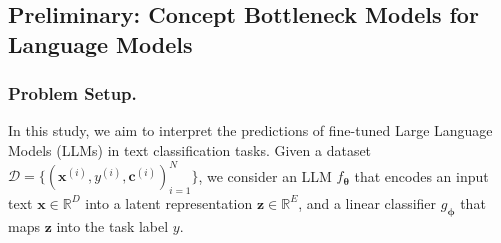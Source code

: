 \documentclass[letterpaper]{article} %
\begin{document}
\subsection{Preliminary: Concept Bottleneck Models for Language Models
}
\subsubsection{Problem Setup.}\label{sec:setup}
In this study, we aim to interpret the predictions of fine-tuned Large Language Models (LLMs) in text classification tasks. Given a dataset $\mathcal{D} = \{(\bm{x}^{(i)}, y^{(i)}, \bm{c}^{(i)})_{i=1}^N\}$, we consider an LLM $f_{\bm{\theta}}$ that encodes an input text $\bm{x} \in \mathbb{R}^D$ into a latent representation $\bm{z} \in \mathbb{R}^E$, and a linear classifier $g_{\bm{\phi}}$ that maps $\bm{z}$ into the task label $y$.
\end{document}
